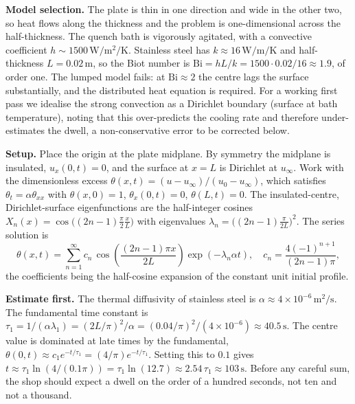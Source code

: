 \textbf{Model selection.} The plate is thin in one direction and
wide in the other two, so heat flows along the thickness
and the problem is one-dimensional across the half-thickness. The
quench bath is vigorously agitated, with a convective coefficient
$h \sim 1500\,\si{\watt\per\meter\squared\per\kelvin}$. Stainless
steel has $k \approx 16\,\si{\watt\per\meter\per\kelvin}$ and
half-thickness $L = 0.02\,\si{\meter}$, so the Biot number is
$\text{Bi} = h L/k = 1500 \cdot 0.02/16 \approx 1.9$, of order one.
The lumped model fails: at $\text{Bi} \approx 2$ the centre lags the
surface substantially, and the distributed heat equation is
required. For a working first pass we idealise the strong
convection as a Dirichlet boundary (surface at bath temperature),
noting that this over-predicts the cooling rate and therefore
under-estimates the dwell, a non-conservative error to be corrected
below.

\textbf{Setup.} Place the origin at the plate midplane. By symmetry
the midplane is insulated, $u_{x}(0, t) = 0$, and the surface at
$x = L$ is Dirichlet at $u_{\infty}$. Work with the dimensionless
excess $\theta(x, t) = (u - u_{\infty})/(u_{0} - u_{\infty})$, which
satisfies $\theta_{t} = \alpha\theta_{xx}$ with $\theta(x, 0) = 1$,
$\theta_{x}(0, t) = 0$, $\theta(L, t) = 0$. The insulated-centre,
Dirichlet-surface eigenfunctions are the half-integer cosines
$X_{n}(x) = \cos\bigl((2n-1)\tfrac{\pi}{2}\tfrac{x}{L}\bigr)$ with
eigenvalues $\lambda_{n} = \bigl((2n-1)\tfrac{\pi}{2L}\bigr)^{2}$.
The series solution is
\[
\theta(x, t) = \sum_{n = 1}^{\infty} c_{n}\, \cos\!\left(\frac{(2n-1)\pi x}{2L}\right) \exp\!\left(-\lambda_{n}\alpha t\right),
\quad
c_{n} = \frac{4(-1)^{n+1}}{(2n-1)\pi},
\]
the coefficients being the half-cosine expansion of the constant
unit initial profile.

\textbf{Estimate first.} The thermal diffusivity of stainless steel
is $\alpha \approx 4 \times 10^{-6}\,\si{\meter\squared\per\second}$.
The fundamental time constant is $\tau_{1} = 1/(\alpha\lambda_{1}) =
(2L/\pi)^{2}/\alpha = (0.04/\pi)^{2}/(4\times 10^{-6}) \approx
40.5\,\si{\second}$. The centre value is dominated at late times by
the fundamental, $\theta(0, t) \approx c_{1} e^{-t/\tau_{1}} =
(4/\pi) e^{-t/\tau_{1}}$. Setting this to $0.1$ gives $t \approx
\tau_{1}\ln(4/(0.1\pi)) = \tau_{1}\ln(12.7) \approx 2.54\,\tau_{1}
\approx 103\,\si{\second}$. Before any careful sum, the shop should
expect a dwell on the order of a hundred seconds, not ten and not a
thousand.

